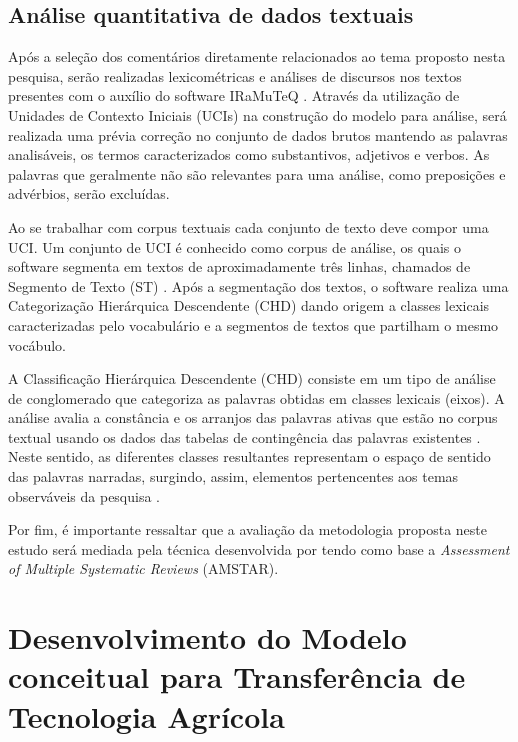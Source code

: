 \subsection{Análise quantitativa de dados textuais}

Após a seleção dos comentários diretamente relacionados ao tema proposto nesta pesquisa, serão realizadas lexicométricas e análises de discursos nos textos presentes com o auxílio do software IRaMuTeQ \cite{conde_lexicometria_2015,da_silva_cezar_panorama_2018}. Através da utilização de Unidades de Contexto Iniciais (UCIs) na construção do modelo para análise, será realizada uma prévia correção no conjunto de dados brutos mantendo as palavras analisáveis, os termos caracterizados como substantivos, adjetivos e verbos. As palavras que geralmente não são relevantes para uma análise, como preposições e advérbios, serão excluídas.

Ao se trabalhar com corpus textuais cada conjunto de texto deve compor uma UCI. Um conjunto de UCI é conhecido como corpus de análise, os quais o software segmenta em textos de aproximadamente três linhas, chamados de Segmento de Texto (ST) \cite{fernandes_avaliacao_2018}. Após a segmentação dos textos, o software realiza uma Categorização Hierárquica Descendente (CHD) dando origem a classes lexicais caracterizadas pelo vocabulário e a segmentos de textos que partilham o mesmo vocábulo.

A Classificação Hierárquica Descendente (CHD) consiste em um tipo de análise de conglomerado que categoriza as palavras obtidas em classes lexicais (eixos). A análise avalia a constância e os arranjos das palavras ativas que estão no corpus textual usando os dados das tabelas de contingência das palavras existentes \cite{carvalho_utilizacao_2020,mendes_mapping_2019}. Neste sentido, as diferentes classes resultantes representam o espaço de sentido das palavras narradas, surgindo, assim, elementos pertencentes aos temas observáveis da pesquisa \cite{gavasso_revisao_2016}. 

Por fim, é importante ressaltar que a avaliação da metodologia proposta neste estudo será mediada pela técnica desenvolvida por  tendo como base a \textit{Assessment of Multiple Systematic Reviews} (AMSTAR).


\section{Desenvolvimento do Modelo conceitual para Transferência de Tecnologia Agrícola}

